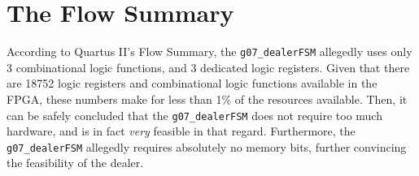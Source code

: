 \documentclass[12pt]{report}
\begin{document}
\section*{The Flow Summary}
According to Quartus II's Flow Summary, the \texttt{g07\_dealerFSM} allegedly uses only 3
combinational logic functions, and 3 dedicated logic registers. Given that there are 18752 logic
registers and combinational logic functions available in the FPGA, these numbers make for less than
1\% of the resources available. Then, it can be safely concluded that the \texttt{g07\_dealerFSM}
does not require too much hardware, and is in fact \textit{very} feasible in that regard.
Furthermore, the \texttt{g07\_dealerFSM} allegedly requires absolutely no memory bits, further
convincing the feasibility of the dealer.
\end{document}
